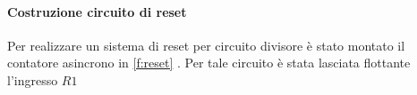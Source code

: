  	\paragraph{Costruzione circuito di reset}
 	Per realizzare un sistema di reset per circuito divisore 
 	è stato montato il contatore asincrono in \figurename{  \ref{f:reset} }.
 	Per tale circuito è stata lasciata flottante l'ingresso $R1$